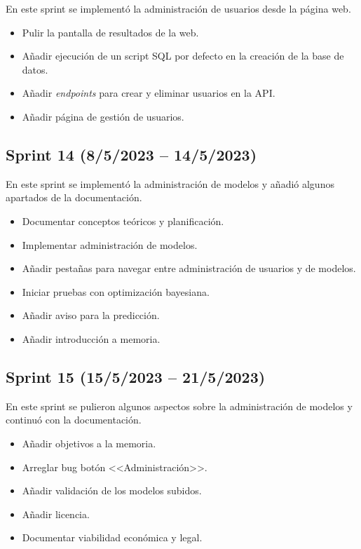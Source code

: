 En este sprint se implementó la administración de usuarios desde la página web.

\begin{itemize}
    \item Pulir la pantalla de resultados de la web.
    \item Añadir ejecución de un script SQL por defecto en la creación de la
    base de datos.
    \item Añadir \textit{endpoints} para crear y eliminar usuarios en la API.
    \item Añadir página de gestión de usuarios.
\end{itemize}

\subsection{Sprint 14 (8/5/2023 -- 14/5/2023)}

En este sprint se implementó la administración de modelos y añadió algunos
apartados de la documentación.

\begin{itemize}
    \item Documentar conceptos teóricos y planificación.
    \item Implementar administración de modelos.
    \item Añadir pestañas para navegar entre administración de usuarios y de
    modelos.
    \item Iniciar pruebas con optimización bayesiana.
    \item Añadir aviso para la predicción.
    \item Añadir introducción a memoria.
\end{itemize}

\subsection{Sprint 15 (15/5/2023 -- 21/5/2023)}

En este sprint se pulieron algunos aspectos sobre la administración de modelos y
continuó con la documentación.

\begin{itemize}
    \item Añadir objetivos a la memoria.
    \item Arreglar bug botón <<Administración>>.
    \item Añadir validación de los modelos subidos.
    \item Añadir licencia.
    \item Documentar viabilidad económica y legal.
\end{itemize}

